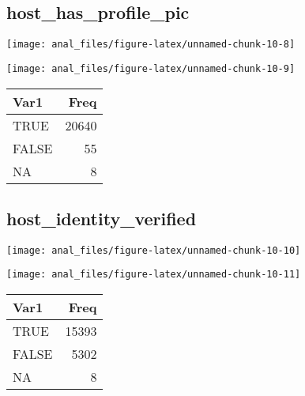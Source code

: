 \pagebreak

\hypertarget{host_has_profile_pic}{%
\subsection{host\_has\_profile\_pic}\label{host_has_profile_pic}}

\begin{center}\texttt{[image: anal\_files/figure-latex/unnamed-chunk-10-8]} \end{center}

\begin{center}\texttt{[image: anal\_files/figure-latex/unnamed-chunk-10-9]} \end{center}

\begin{table}[H]
\centering
\begin{tabular}[t]{lr}
\toprule
Var1 & Freq\\
\midrule
TRUE & 20640\\
FALSE & 55\\
NA & 8\\
\bottomrule
\end{tabular}
\end{table}
\pagebreak

\hypertarget{host_identity_verified}{%
\subsection{host\_identity\_verified}\label{host_identity_verified}}

\begin{center}\texttt{[image: anal\_files/figure-latex/unnamed-chunk-10-10]} \end{center}

\begin{center}\texttt{[image: anal\_files/figure-latex/unnamed-chunk-10-11]} \end{center}

\begin{table}[H]
\centering
\begin{tabular}[t]{lr}
\toprule
Var1 & Freq\\
\midrule
TRUE & 15393\\
FALSE & 5302\\
NA & 8\\
\bottomrule
\end{tabular}
\end{table}
\pagebreak

